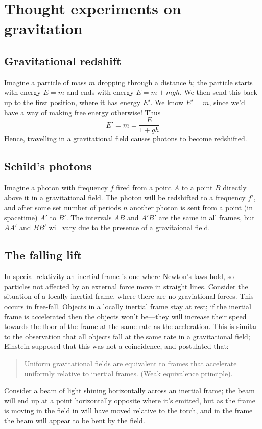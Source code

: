 
\section{Thought experiments on gravitation}
\label{sec:thought-exper-grav}

\subsection{Gravitational redshift}
\label{sec:grav-redsh}

Imagine a particle of mass $m$ dropping through a distance $h$; the
particle starts with energy $E=m$ and ends with energy $E=m+mgh$. We
then send this back up to the first position, where it has energy
$E'$. We know $E'=m$, since we'd have a way of making free energy
otherwise! Thus
\[ E' = m = \frac{E}{1+gh} \] Hence, travelling in a gravitational
field causes photons to become redshifted.

\subsection{Schild's photons}
\label{sec:schilds-photons}

Imagine a photon with frequency $f$ fired from a point $A$ to a point
$B$ directly above it in a gravitational field. The photon will be
redshifted to a frequency $f'$, and after some set number of periods
$n$ another photon is sent from a point (in spacetime) $A'$ to
$B'$. The intervals $AB$ and $A'B'$ are the same in all frames, but
$AA'$ and $BB'$ will vary due to the presence of a gravitaional field.

\subsection{The falling lift}
\label{sec:falling-lift}

In special relativity an inertial frame is one where Newton's laws
hold, so particles not affected by an external force move in straight
lines. Consider the situation of a locally inertial frame, where there
are no graviational forces. This occurs in free-fall. Objects in a
locally inertial frame stay at rest; if the inertial frame is
accelerated then the objects won't be---they will increase their speed
towards the floor of the frame at the same rate as the
accleration. This is similar to the observation that all objects fall
at the same rate in a gravitational field; Einstein supposed that this
was not a coincidence, and postulated that:
\begin{quotation}
  Uniform gravitational fields are equivalent to frames that
  accelerate uniformly relative to inertial frames. (Weak equivalence
  principle).
\end{quotation}
Consider a beam of light shining horizontally across an inertial
frame; the beam will end up at a point horizontally opposite where
it's emitted, but as the frame is moving in the field in will have
moved relative to the torch, and in the frame the beam will appear to
be bent by the field.

